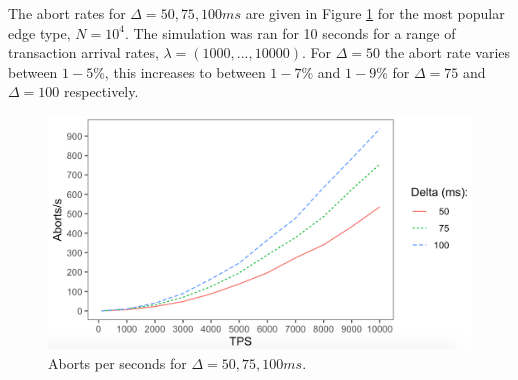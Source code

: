 The abort rates for $\Delta = 50, 75, 100ms$ are given in Figure \ref{aborts-results} for the most popular edge type, $N=10^4$. The simulation was ran for 10 seconds for a range of transaction arrival rates, $\lambda = (1000, ..., 10000)$. For $\Delta = 50$ the abort rate varies between $1-5\%$, this increases to between $1-7\%$ and $1-9\%$ for $\Delta = 75$ and $\Delta = 100$ respectively.

\begin{figure}[h]
  \centering
  \includegraphics[width=\linewidth]{./figures/aborts_50_75_100}
  \caption{Aborts per seconds for $\Delta = 50, 75, 100ms$.}
  \label{aborts-results}
\end{figure}
